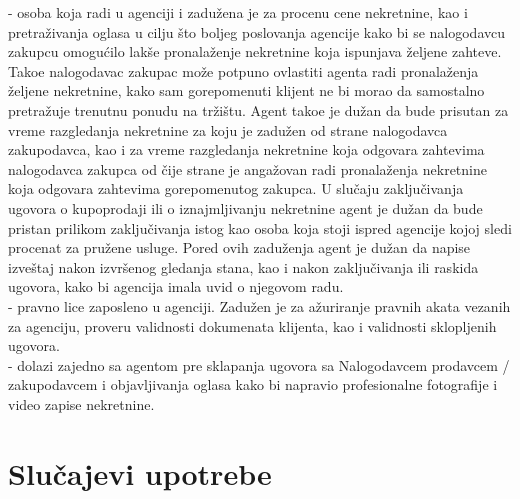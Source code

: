 \documentclass[20pt]{article}
\begin{document}
 - osoba koja radi u agenciji i zadu\v {z}ena je za procenu cene nekretnine, kao i pretra\v {z}ivanja oglasa u cilju \v {s}to boljeg poslovanja agencije kako bi se nalogodavcu zakupcu omogu\' cilo lak\v {s}e pronala\v {z}enje nekretnine koja ispunjava \v {z}eljene zahteve. Tako\dj e nalogodavac zakupac mo\v {z}e potpuno ovlastiti agenta radi pronala\v {z}enja \v {z}eljene nekretnine, kako sam gorepomenuti klijent ne bi morao da samostalno pretra\v {z}uje trenutnu ponudu na tr\v {z}i\v {s}tu. Agent tako\dj e je du\v {z}an da bude prisutan za vreme razgledanja nekretnine za koju je zadu\v {z}en od strane nalogodavca zakupodavca, kao i za vreme razgledanja nekretnine koja odgovara zahtevima nalogodavca zakupca od \v {c}ije strane je anga\v {z}ovan radi pronala\v {z}enja nekretnine koja odgovara zahtevima gorepomenutog zakupca. U slu\v {c}aju zaklju\v {c}ivanja ugovora o kupoprodaji ili o iznajmljivanju nekretnine agent je du\v {z}an da bude pristan prilikom zaklju\v {c}ivanja istog kao osoba koja stoji ispred agencije kojoj sledi procenat za pru\v {z}ene usluge. Pored ovih zadu\v {z}enja agent je du\v {z}an da napise izve\v {s}taj nakon izvr\v {s}enog gledanja stana, kao i nakon zaklju\v {c}ivanja ili raskida ugovora, kako bi agencija imala uvid o njegovom radu.\\

 - pravno lice zaposleno u agenciji. Zadu\v{z}en je za a\v{z}uriranje pravnih akata vezanih za agenciju, proveru validnosti dokumenata klijenta, kao i validnosti sklopljenih ugovora.\\ 

 - dolazi zajedno sa agentom pre sklapanja ugovora sa Nalogodavcem prodavcem / zakupodavcem i objavljivanja oglasa kako bi napravio profesionalne fotografije i video zapise nekretnine. 

\newpage
\section{\bfseries \Large Slu\v{c}ajevi upotrebe}
\setlength{\parindent}{1cm}
\fontsize{13}{18} \selectfont 
\end{document}
